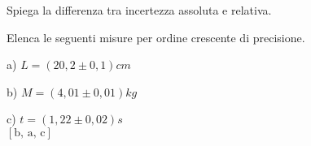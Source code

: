 \begin{esercizio}
Spiega la differenza tra incertezza assoluta e relativa.
\end{esercizio}

\begin{esercizio}
Elenca le seguenti misure per ordine crescente di precisione.
\begin{multicols}{3}
\begin{elenco}
 \item[a)] $L=\left(20,2 \pm 0,1\right)\si{cm}$
 \item[b)] $M=\left(4,01 \pm 0,01\right)\si{kg}$
 \item[c)] $t=\left(1,22 \pm 0,02\right)\si{s}$ \\
 \hspace*{\fill}  $\left[\text{b, a, c}\right]$
\end{elenco}
\end{multicols}

\end{esercizio}


